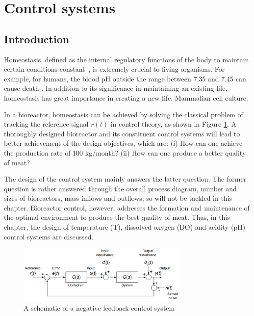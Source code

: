 \newpage
\section{Control systems}
\vspace{-3mm}
\subsection{Introduction}
\vspace{-3mm}



Homeostasis, defined as the internal regulatory functions of the body to maintain certain conditions constant~\citep{E-Guyton2006, E-Aging2022}, is extremely crucial to living organisms. For example, for humans, the blood pH outside the range between 7.35 and 7.45 can cause death \cite{E-Donaldson2013}. In addition to its significance in maintaining an existing life, homeostasis has great importance in creating a new life: Mammalian cell culture.

In a bioreactor, homeostasis can be achieved by solving the classical problem of tracking the reference signal $r(t)$ in control theory, as shown in Figure \ref{figure:E-1-1-control-system}. A thoroughly designed bioreactor and its constituent control systems will lead to better achievement of the design objectives, which are: (i) How can one achieve the production rate of 100 kg/month? (ii) How can one produce a better quality of meat?

The design of the control system mainly answers the latter question. The former question is rather answered through the overall process diagram, number and sizes of bioreactors, mass inflows and outflows, so will not be tackled in this chapter. Bioreactor control, however, addresses the formation and maintenance of the optimal environment to produce the best quality of meat. Thus, in this chapter, the design of temperature (T), dissolved oxygen (DO) and acidity (pH) control systems are discussed.

\begin{figure}[h]
    \centering
    \includegraphics[width=0.75\textwidth]{eunsoo/E-1-1-control-system.png}
    \hfill
    \caption{A schematic of a negative feedback control system \citet{E-Cannon2022}}
    \label{figure:E-1-1-control-system}
\end{figure}

